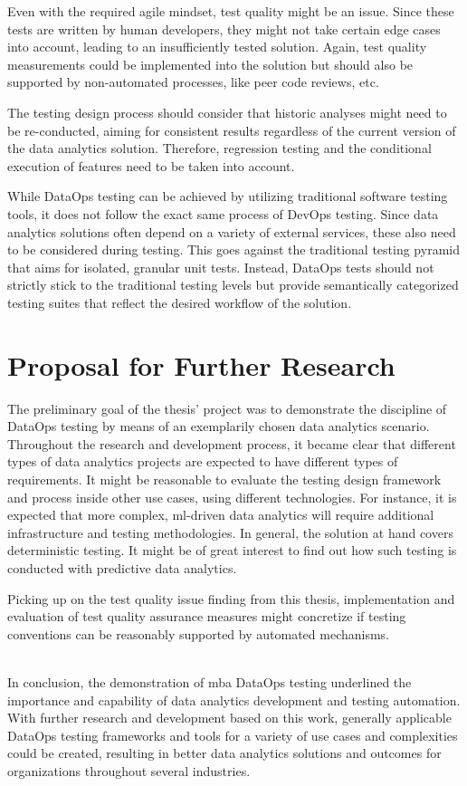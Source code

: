 Even with the required agile mindset, test quality might be an issue. Since these tests are written by human developers, they might not take certain edge cases into account, leading to an insufficiently tested solution. Again, test quality measurements could be implemented into the solution but should also be supported by non-automated processes, like peer code reviews, etc.

The testing design process should consider that historic analyses might need to be re-conducted, aiming for consistent results regardless of the current version of the data analytics solution. Therefore, regression testing and the conditional execution of features need to be taken into account.

While DataOps testing can be achieved by utilizing traditional software testing tools, it does not follow the exact same process of DevOps testing. Since data analytics solutions often depend on a variety of external services, these also need to be considered during testing. This goes against the traditional testing pyramid that aims for isolated, granular unit tests. Instead, DataOps tests should not strictly stick to the traditional testing levels but provide semantically categorized testing suites that reflect the desired workflow of the solution.

\section{Proposal for Further Research}
The preliminary goal of the thesis' project was to demonstrate the discipline of DataOps testing by means of an exemplarily chosen data analytics scenario. Throughout the research and development process, it became clear that different types of data analytics projects are expected to have different types of requirements. It might be reasonable to evaluate the testing design framework and process inside other use cases, using different technologies. For instance, it is expected that more complex, \acs{ml}-driven data analytics will require additional infrastructure and testing methodologies. In general, the solution at hand covers deterministic testing. It might be of great interest to find out how such testing is conducted with predictive data analytics. \newpage

Picking up on the test quality issue finding from this thesis, implementation and evaluation of test quality assurance measures might concretize if testing conventions can be reasonably supported by automated mechanisms. \\\

In conclusion, the demonstration of \ac{mba} DataOps testing underlined the importance and capability of data analytics development and testing automation. With further research and development based on this work, generally applicable DataOps testing frameworks and tools for a variety of use cases and complexities could be created, resulting in better data analytics solutions and outcomes for organizations throughout several industries.